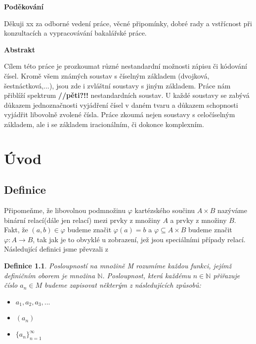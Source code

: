 \documentclass[12pt]{book}
\newtheorem{definice}{Definice}
\begin{document}
\newpage

\begin{center}
	\textbf{Poděkování}

Děkuji xx za odborné vedení práce, věcné připomínky, dobré rady a vstřícnost při
konzultacích a vypracovávání bakalářské práce.
\end{center}

\newpage

\textbf{Abstrakt}

Cílem této práce je prozkoumat různé nestandardní možnosti zápisu či kódování čísel. Kromě všem známých soustav s číselným základem (dvojková, šestnáctková,...), jsou zde i zvláštní soustavy s jiným základem. Práce nám přiblíží spektrum \textbf{//pěti?!!} nestandardních soustav. U každé soustavy se zabývá důkazem jednoznačnosti vyjádření čísel v daném tvaru a důkazem schopnosti vyjádřit libovolně zvolené čísla. Práce zkoumá nejen soustavy s celočíselným základem, ale i se základem iracionálním, či dokonce komplexním.

\newpage

\tableofcontents

\newpage

\chapter{Úvod}
\section{Definice}

\newcommand{\poslbeta}{\{\beta_i\}_{i=1}^{\infty}}
\newcommand{\poslalpha}{\{\alpha_i\}_{i=0}^{\infty}}
\newcommand{\posla}{\{a_i\}_{i=0}^{\infty}}
\newcommand{\poslb}{\{b_i\}_{i=1}^{\infty}}

Připomeňme, že libovolnou podmnožinu $\varphi$ kartézského součinu $A \times B$ nazýváme binární relací(dále jen relací) mezi prvky z množiny $A$ a prvky z množiny $B$. Fakt, že $(a,b)\in \varphi$ budeme značit $\varphi(a) = b$ a $\varphi \subseteq A \times B$ budeme značit $\varphi : A \rightarrow B$, tak jak je to obvyklé u zobrazení, jež jsou speciálními případy relací.\newline\newline
Následující definici jsme převzali z \cite{aa}
\begin{definice}
	Posloupností na množině M rozumíme každou funkci, jejímž definičním oborem je množina $\mathbb{N}$. Posloupnost, která každému $n \in \mathbb{N}$ přiřazuje číslo $a_n \in M$ budeme zapisovat některým z následujících způsobů:
	\begin{itemize}
		\item $a_1, a_2, a_3, ...$
		\item $(a_n)$
		\item $\{a_n\}_{n=1}^{\infty}$
	\end{itemize}
\end{definice}
\end{document}
